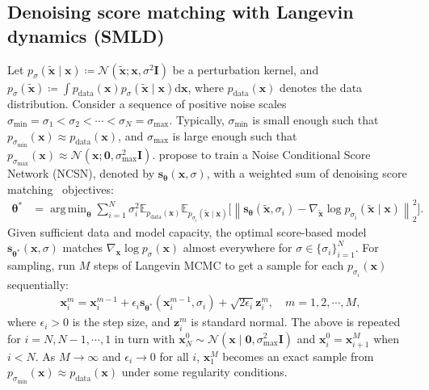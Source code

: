 \documentclass{article} \usepackage{iclr2021_conference,times}
\newcommand{\mbb}[1]{\mathbb{#1}}
\newcommand{\ud}{\mathrm{d}}
\newcommand{\mcal}{\mathcal}
\newcommand{\norm}[1]{\left\lVert#1\right\rVert}
\DeclareMathOperator*{\argmin}{arg\,min}
\newcommand{\bfx}{\mathbf{x}}
\newcommand{\bfz}{\mathbf{z}}
\newcommand{\bfI}{\mathbf{I}}
\newcommand{\bfzero}{\mathbf{0}}
\newcommand{\bftheta}{{\boldsymbol{\theta}}}
\newcommand{\bfs}{\mathbf{s}}
\newcommand{\pd}{p_{\mathrm{data}}}
\newcommand{\sm}{\sigma_{\text{min}}}
\newcommand{\sM}{\sigma_{\text{max}}}
\begin{document}
\subsection{Denoising score matching with Langevin dynamics (SMLD)}\label{sec:ncsn}
Let $p_{\sigma}(\tilde{\bfx} \mid \bfx) \coloneqq \mcal{N}(\tilde{\bfx}; \bfx, \sigma^2 \bfI)$ be a perturbation kernel, and $p_{\sigma}(\tilde{\bfx}) \coloneqq \int \pd(\bfx) p_{\sigma}(\tilde{\bfx} \mid \bfx) \ud \bfx$, where $\pd(\bfx)$ denotes the data distribution. Consider a sequence of positive noise scales $\sm = \sigma_1 < \sigma_2 < \cdots < \sigma_{N} = \sM$. Typically, $\sm$ is small enough such that $p_{\sm}(\bfx) \approx \pd(\bfx)$, and $\sM$ is large enough such that $p_{\sM}(\bfx) \approx \mcal{N}(\bfx; \bfzero, \sM^2 \bfI)$. \citet{song2019generative} propose to train a Noise Conditional Score Network (NCSN), denoted by $\bfs_\bftheta(\bfx, \sigma)$, with a weighted sum of denoising score matching~\citep{vincent2011connection} objectives:
\begin{align}
\bftheta^* &= \argmin_\bftheta
   \sum_{i=1}^{N} \sigma_i^2  \mbb{E}_{\pd(\bfx)}\mbb{E}_{p_{\sigma_i}(\tilde{\bfx} \mid \bfx)}\big[\norm{ \bfs_\bftheta(\tilde{\bfx}, \sigma_i) - \nabla_{\tilde{\bfx}} \log p_{\sigma_i}(\tilde{\bfx} \mid \bfx)}_2^2 \big]. \label{eqn:ncsn_obj}
\end{align}
Given sufficient data and model capacity, the optimal score-based model $\bfs_{\bftheta^*}(\bfx, \sigma)$ matches $\nabla_\bfx \log p_{\sigma}(\bfx)$ almost everywhere for $\sigma \in \{\sigma_i\}_{i=1}^{N}$. For sampling, \citet{song2019generative} run $M$ steps of Langevin MCMC to get a sample for each $p_{\sigma_i}(\bfx)$ sequentially:
\begin{align}
    \bfx_i^m = \bfx_i^{m-1} + \epsilon_i \bfs_{\bftheta^*}(\bfx_i^{m-1}, \sigma_{i}) + \sqrt{2\epsilon_i} \bfz_{i}^m,\quad m=1,2,\cdots, M,\label{eqn:langevin}
\end{align}
where $\epsilon_i > 0$ is the step size, and $\bfz_i^m$ is standard normal. The above is repeated for $i=N, N-1, \cdots, 1$ in turn with $\bfx_{N}^0 \sim \mcal{N}(\bfx \mid \bfzero, \sM^2 \bfI)$ and $\bfx_i^0 = \bfx_{i+1}^{M}$ when $i < N$. As $M \to \infty$ and $\epsilon_i \to 0$ for all $i$, $\bfx_1^M$ becomes an exact sample from $p_{\sm}(\bfx) \approx \pd(\bfx)$ under some regularity conditions.
\end{document}
